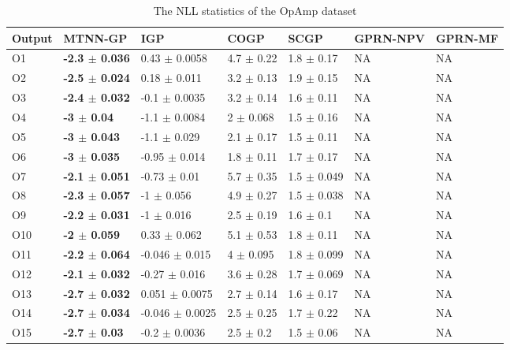 \begin{table}[!htb]
    \centering
    \caption{The NLL statistics of the OpAmp dataset}
    \label{tab:nll_DAC}
    \begin{tabular}{lllllll}
        \toprule
        Output & MTNN-GP              & IGP                     & COGP                & SCGP                & GPRN-NPV & GPRN-MF \\ \midrule
        O1     &  \textbf{-2.3  $\pm$  0.036}  &  0.43    $\pm$  0.0058  &  4.7  $\pm$  0.22   &  1.8  $\pm$  0.17   &  NA      & NA \\
        O2     &  \textbf{-2.5  $\pm$  0.024}  &  0.18    $\pm$  0.011   &  3.2  $\pm$  0.13   &  1.9  $\pm$  0.15   &  NA      & NA \\
        O3     &  \textbf{-2.4  $\pm$  0.032}  &  -0.1    $\pm$  0.0035  &  3.2  $\pm$  0.14   &  1.6  $\pm$  0.11   &  NA      & NA \\
        O4     &  \textbf{-3    $\pm$  0.04 }  &  -1.1    $\pm$  0.0084  &  2    $\pm$  0.068  &  1.5  $\pm$  0.16   &  NA      & NA \\
        O5     &  \textbf{-3    $\pm$  0.043}  &  -1.1    $\pm$  0.029   &  2.1  $\pm$  0.17   &  1.5  $\pm$  0.11   &  NA      & NA \\
        O6     &  \textbf{-3    $\pm$  0.035}  &  -0.95   $\pm$  0.014   &  1.8  $\pm$  0.11   &  1.7  $\pm$  0.17   &  NA      & NA \\
        O7     &  \textbf{-2.1  $\pm$  0.051}  &  -0.73   $\pm$  0.01    &  5.7  $\pm$  0.35   &  1.5  $\pm$  0.049  &  NA      & NA \\
        O8     &  \textbf{-2.3  $\pm$  0.057}  &  -1      $\pm$  0.056   &  4.9  $\pm$  0.27   &  1.5  $\pm$  0.038  &  NA      & NA \\
        O9     &  \textbf{-2.2  $\pm$  0.031}  &  -1      $\pm$  0.016   &  2.5  $\pm$  0.19   &  1.6  $\pm$  0.1    &  NA      & NA \\
        O10    &  \textbf{-2    $\pm$  0.059}  &  0.33    $\pm$  0.062   &  5.1  $\pm$  0.53   &  1.8  $\pm$  0.11   &  NA      & NA \\
        O11    &  \textbf{-2.2  $\pm$  0.064}  &  -0.046  $\pm$  0.015   &  4    $\pm$  0.095  &  1.8  $\pm$  0.099  &  NA      & NA \\
        O12    &  \textbf{-2.1  $\pm$  0.032}  &  -0.27   $\pm$  0.016   &  3.6  $\pm$  0.28   &  1.7  $\pm$  0.069  &  NA      & NA \\
        O13    &  \textbf{-2.7  $\pm$  0.032}  &  0.051   $\pm$  0.0075  &  2.7  $\pm$  0.14   &  1.6  $\pm$  0.17   &  NA      & NA \\
        O14    &  \textbf{-2.7  $\pm$  0.034}  &  -0.046  $\pm$  0.0025  &  2.5  $\pm$  0.25   &  1.7  $\pm$  0.22   &  NA      & NA \\
        O15    &  \textbf{-2.7  $\pm$  0.03 }  &  -0.2    $\pm$  0.0036  &  2.5  $\pm$  0.2    &  1.5  $\pm$  0.06   &  NA      & NA \\
        \bottomrule
    \end{tabular}
\end{table}

